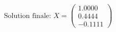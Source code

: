 \documentclass[preview]{standalone}
\begin{document}
\begin{align*}
\text{Solution finale: } X = \begin{pmatrix} 1.0000 \\ 0.4444 \\ -0.1111 \end{pmatrix}
\end{align*}
\end{document}
